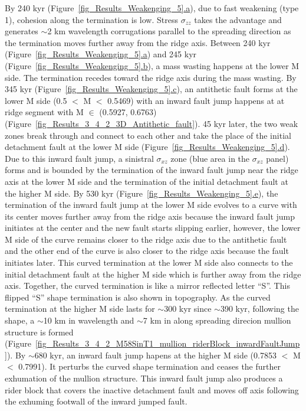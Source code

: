 By 240 kyr (Figure~\hyperref[fig_Results_Weakenging_5]{\ref{fig_Results_Weakenging_5}.a}), due to fast weakening (type 1), cohesion along the termination is low. Stress $\sigma_{zz}$ takes the advantage and generates $\sim$2 km wavelength corrugations parallel to the spreading direction as the termination moves further away from the ridge axis. Between 240 kyr (Figure~\hyperref[fig_Results_Weakenging_5]{\ref{fig_Results_Weakenging_5}.a}) and 245 kyr (Figure~\hyperref[fig_Results_Weakenging_5]{\ref{fig_Results_Weakenging_5}.b}), a mass wasting happens at the lower M side. The termination recedes toward the ridge axis during the mass wasting. By 345 kyr (Figure~\hyperref[fig_Results_Weakenging_5]{\ref{fig_Results_Weakenging_5}.c}), an antithetic fault forms at the lower M side (0.5 $<$ M $<$ 0.5469) with an inward fault jump happens at at ridge segment with M $\in$ (0.5927, 0.6763) (Figure~\hyperref[fig_Results_3_4_2_3D_Antithetic_fault]{\ref{fig_Results_3_4_2_3D_Antithetic_fault}}). 45 kyr later, the two weak zones break through and connect to each other and take the place of the initial detachment fault at the lower M side (Figure~\hyperref[fig_Results_Weakenging_5]{\ref{fig_Results_Weakenging_5}.d}). Due to this inward fault jump, a sinistral $\sigma_{xz}$ zone (blue area in the $\sigma_{xz}$ panel) forms and is bounded by the termination of the inward fault jump near the ridge axis at the lower M side and the termination of the initial detachment fault at the higher M side. By 530 kyr (Figure~\hyperref[fig_Results_Weakenging_5]{\ref{fig_Results_Weakenging_5}.e}), the termination of the inward fault jump at the lower M side evolves to a curve with its center moves further away from the ridge axis because the inward fault jump initiates at the center and the new fault starts slipping earlier, however, the lower M side of the curve remains closer to the ridge axis due to the antithetic fault and the other end of the curve is also closer to the ridge axis because the fault initiates later. This curved termination at the lower M side also connects to the initial detachment fault at the higher M side which is further away from the ridge axis. Together, the curved termination is like a mirror reflected letter ``S''. This flipped ``S'' shape termination is also shown in topography. As the curved termination at the higher M side lasts for $\sim$300 kyr since $\sim$390 kyr, following the shape, a $\sim$10 km in wavelength and $\sim$7 km in along spreading direcion mullion structure is formed (Figure~\hyperref[fig_Results_3_4_2_M58SinT1_mullion_riderBlock_inwardFaultJump]{\ref{fig_Results_3_4_2_M58SinT1_mullion_riderBlock_inwardFaultJump}}). By $\sim$680 kyr, an inward fault jump hapens at the higher M side (0.7853 $<$ M $<$ 0.7991). It perturbs the curved shape termination and ceases the further exhumation of the mullion structure. This inward fault jump also produces a rider block that covers the inactive detachment fault and moves off axis following the exhuming footwall of the inward jumped fault.

